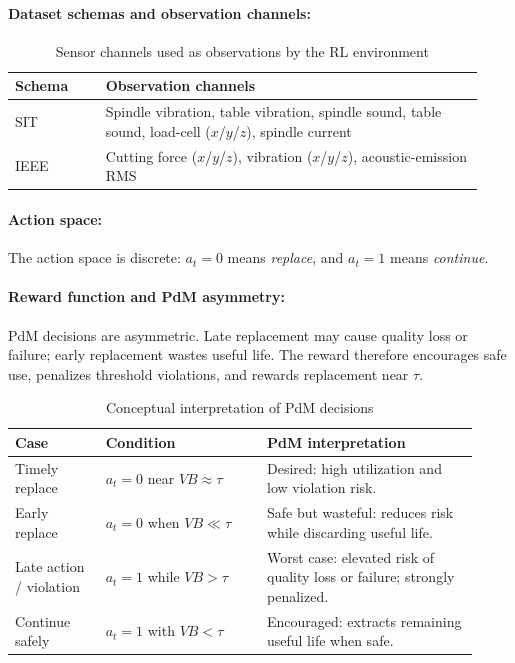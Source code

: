 \documentclass[sn-basic]{sn-jnl}%
\begin{document}
\paragraph{Dataset schemas and observation channels:}
\begin{table}[htbp]
\centering
\caption{Sensor channels used as observations by the RL environment}
\label{tab:schema_features}
	\begin{tabular}{L{0.18\linewidth} L{0.75\linewidth}}
	\toprule
	\textbf{Schema} & \textbf{Observation channels}\\
	\midrule
	SIT & Spindle vibration, table vibration, spindle sound, table sound, load-cell ($x$/$y$/$z$), spindle current\\
	IEEE & Cutting force ($x$/$y$/$z$), vibration ($x$/$y$/$z$), acoustic-emission RMS\\
	\bottomrule
	\end{tabular}
\end{table}

\paragraph{Action space:}
The action space is discrete: $a_t=0$ means \emph{replace}, and $a_t=1$ means \emph{continue}.

\paragraph{Reward function and PdM asymmetry:}
PdM decisions are asymmetric. Late replacement may cause quality loss or failure; early replacement wastes useful life. The reward therefore encourages safe use, penalizes threshold violations, and rewards replacement near $\tau$.

\begin{table}[htbp]
	\centering
	\caption{Conceptual interpretation of PdM decisions}
	\label{tab:cost_view}
	\begin{tabular}{L{0.18\linewidth} L{0.32\linewidth} L{0.42\linewidth}}
		\toprule
		\textbf{Case} & \textbf{Condition} & \textbf{PdM interpretation}\\
		\midrule
		Timely replace & $a_t=0$ near $VB\approx\tau$ & Desired: high utilization and low violation risk.\\
		Early replace & $a_t=0$ when $VB\ll\tau$ & Safe but wasteful: reduces risk while discarding useful life.\\
		Late action / violation & $a_t=1$ while $VB>\tau$ & Worst case: elevated risk of quality loss or failure; strongly penalized.\\
		Continue safely & $a_t=1$ with $VB<\tau$ & Encouraged: extracts remaining useful life when safe.\\
		\bottomrule
	\end{tabular}
\end{table}
\end{document}
